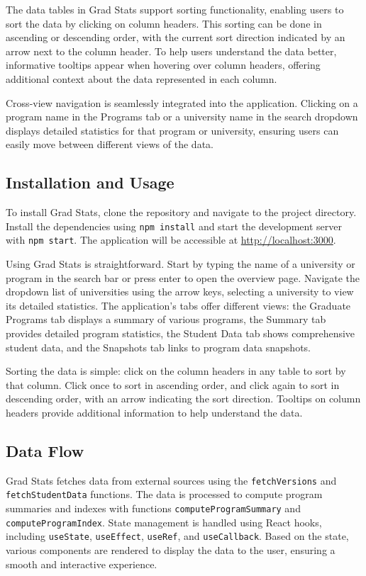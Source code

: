 \documentclass[11pt]{article}
\begin{document}
The data tables in Grad Stats support sorting functionality, enabling users to sort the data by clicking on column headers. This sorting can be done in ascending or descending order, with the current sort direction indicated by an arrow next to the column header. To help users understand the data better, informative tooltips appear when hovering over column headers, offering additional context about the data represented in each column.

Cross-view navigation is seamlessly integrated into the application. Clicking on a program name in the Programs tab or a university name in the search dropdown displays detailed statistics for that program or university, ensuring users can easily move between different views of the data.

\subsection{Installation and Usage}

To install Grad Stats, clone the repository and navigate to the project directory. Install the dependencies using \texttt{npm install} and start the development server with \texttt{npm start}. The application will be accessible at \url{http://localhost:3000}.

Using Grad Stats is straightforward. Start by typing the name of a university or program in the search bar or press enter to open the overview page. Navigate the dropdown list of universities using the arrow keys, selecting a university to view its detailed statistics. The application’s tabs offer different views: the Graduate Programs tab displays a summary of various programs, the Summary tab provides detailed program statistics, the Student Data tab shows comprehensive student data, and the Snapshots tab links to program data snapshots.

Sorting the data is simple: click on the column headers in any table to sort by that column. Click once to sort in ascending order, and click again to sort in descending order, with an arrow indicating the sort direction. Tooltips on column headers provide additional information to help understand the data.

\subsection{Data Flow}

Grad Stats fetches data from external sources using the \texttt{fetchVersions} and \texttt{fetchStudentData} functions.
The data is processed to compute program summaries and indexes with functions \texttt{computeProgramSummary} and \texttt{computeProgramIndex}. State management is handled using React hooks, including \texttt{useState}, \texttt{useEffect}, \texttt{useRef}, and \texttt{useCallback}. Based on the state, various components are rendered to display the data to the user, ensuring a smooth and interactive experience.
\end{document}
